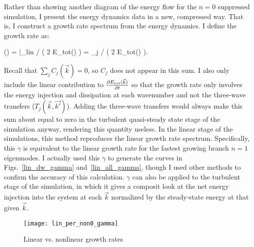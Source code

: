 Rather than showing another diagram of the energy flow for the $n=0$ suppressed simulation, I present the energy dynamics data in a new, compressed way. That is, I construct a growth rate
spectrum from the energy dynamics. I define the growth rate as:

\beq
\label{gamma_def}
\gamma() =  \bigg|_{lin} \bigg/ \left( 2 E_{tot}() \right) = \sum_j  \bigg/ \left( 2 E_{tot}() \right).
\eeq

Recall that $\sum_j C_j(\vec{k}) = 0$, so $C_j$ does not appear in this sum. I also only include the linear contribution to $ \frac{\partial E_{tot}({\vec{k}})}{\partial t}$ so that the growth rate
only involves the energy injection and dissipation at each wavenumber and not the three-wave transfers ($T_j(\vec{k},\vec{k'})$). 
Adding the three-wave transfers would always make this sum about equal to zero in the turbulent
quasi-steady state stage of the simulation anyway, rendering this quantity useless. 
In the linear stage of the simulations, this method reproduces the linear growth rate spectrum.
Specifically, this $\gamma$ is equivalent to the linear growth rate for the fastest growing branch $n=1$ eigenmodes.
I actually used this $\gamma$ to generate the curves in Figs.~\ref{lin_dw_gamma} and~\ref{lin_all_gamma}, though I used other methods to confirm the accuracy of this calculation.
$\gamma$ can also be applied to the turbulent stage of the simulation, in which it gives a composit look at the net energy injection into the system at each $\vec{k}$ normalized
by the steady-state energy at that given $\vec{k}$.

\begin{figure}[!ht]
\centerline{\texttt{[image: lin\_per\_non0\_gamma]}}
\caption{Linear vs. nonlinear growth rates}
\label{lin_per_non0_gamma}
\end{figure}

